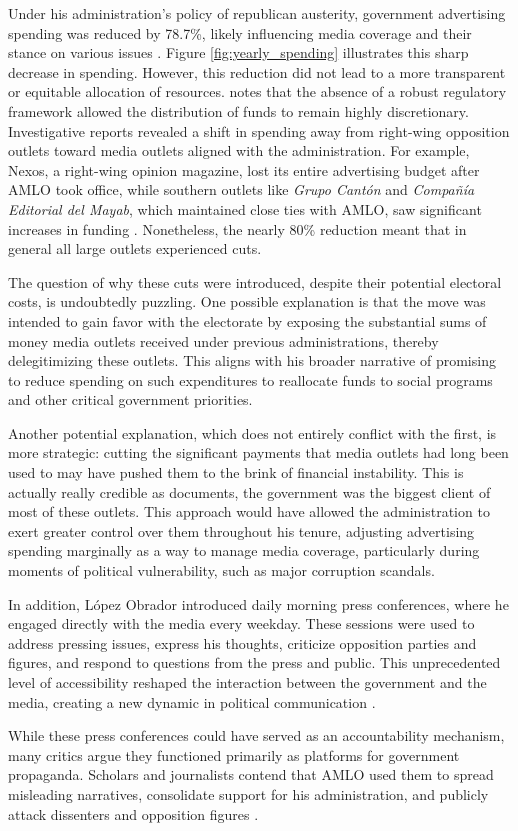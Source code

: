 Under his administration’s policy of republican austerity, government advertising spending was reduced by 78.7\%, likely influencing media coverage and their stance on various issues \citep{Article19, ElEconomist-Republican}. Figure \ref{fig:yearly_spending} illustrates this sharp decrease in spending. However, this reduction did not lead to a more transparent or equitable allocation of resources. \cite{Article19} notes that the absence of a robust regulatory framework allowed the distribution of funds to remain highly discretionary. Investigative reports revealed a shift in spending away from right-wing opposition outlets toward media outlets aligned with the administration. For example, Nexos, a right-wing opinion magazine, lost its entire advertising budget after AMLO took office, while southern outlets like \textit{Grupo Cantón} and \textit{Compañía Editorial del Mayab}, which maintained close ties with AMLO, saw significant increases in funding \citep{Animal-Discrecionalidad}. Nonetheless, the nearly 80\% reduction meant that in general all large outlets experienced cuts.

The question of why these cuts were introduced, despite their potential electoral costs, is undoubtedly puzzling. One possible explanation is that the move was intended to gain favor with the electorate by exposing the substantial sums of money media outlets received under previous administrations, thereby delegitimizing these outlets. This aligns with his broader narrative of promising to reduce spending on such expenditures to reallocate funds to social programs and other critical government priorities.

Another potential explanation, which does not entirely conflict with the first, is more strategic: cutting the significant payments that media outlets had long been used to may have pushed them to the brink of financial instability. This is actually really credible as \cite{Times} documents, the government was the biggest client of most of these outlets. This approach would have allowed the administration to exert greater control over them throughout his tenure, adjusting advertising spending marginally as a way to manage media coverage, particularly during moments of political vulnerability, such as major corruption scandals.

In addition, López Obrador introduced daily morning press conferences, where he engaged directly with the media every weekday. These sessions were used to address pressing issues, express his thoughts, criticize opposition parties and figures, and respond to questions from the press and public. This unprecedented level of accessibility reshaped the interaction between the government and the media, creating a new dynamic in political communication \citep{ThugMex-VictorHugo-JourPract}.

While these press conferences could have served as an accountability mechanism, many critics argue they functioned primarily as platforms for government propaganda. Scholars and journalists contend that AMLO used them to spread misleading narratives, consolidate support for his administration, and publicly attack dissenters and opposition figures \citep{OtrosDatos}.


